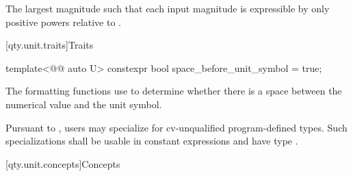 \begin{itemdescr}
\pnum
\returns
The largest magnitude 
such that each input magnitude is expressible
by only positive powers relative to .
\end{itemdescr}

[qty.unit.traits]{Traits}

\begin{itemdecl}
template<@@ auto U>
constexpr bool space_before_unit_symbol = true;
\end{itemdecl}

\begin{itemdescr}
\pnum
The formatting functions use 
to determine whether there is a space
between the numerical value and the unit symbol.

\pnum
\remarks
Pursuant to ,
users may specialize 
for cv-unqualified program-defined types.
Such specializations shall be usable in constant expressions
and have type .
\end{itemdescr}

[qty.unit.concepts]{Concepts}


